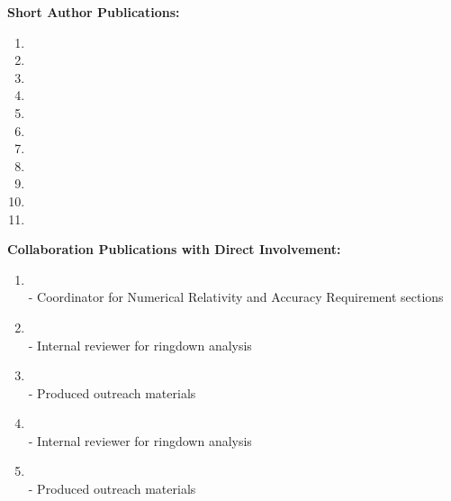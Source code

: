 \documentclass[11pt]{article}
\newcounter{papers}
\begin{document}
\begin{flushleft}
  \vspace{8px}

  \textbf{Short Author Publications:}
  \begin{enumerate}  
    \item {}
    \item {}    
    \item {}
    \item {}
    \item {}
    \item {}
	\item {}
    \item {}
    \item {}
    \item {}
    \item {}
    \setcounter{papers}{\value{enumi}}
  \end{enumerate}
  
  \textbf{Collaboration Publications with Direct Involvement:}  
  \begin{enumerate}
  \setcounter{enumi}{\value{papers}}
  \item {}\\
  - Coordinator for Numerical Relativity and Accuracy Requirement sections
  \item {}\\
  - Internal reviewer for ringdown analysis
  \item {}\\
  - Produced outreach materials
  \item {}\\
  - Internal reviewer for ringdown analysis
  \item {}\\
  - Produced outreach materials
  \setcounter{papers}{\value{enumi}}
  \end{enumerate}
  

\end{flushleft}
\end{document}
